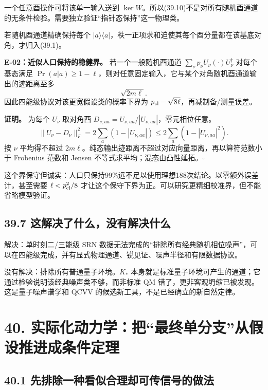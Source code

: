 \documentclass[
  11pt,
  oneside]{book}
\begin{document}
一个任意酉操作可将该单一输入送到
\(\ker W\)。所以(39.10)不是对所有随机酉通道的无条件检验。需要独立验证``指针态保持''这一物理类。

若随机酉通道精确保持每个
\(|a\rangle\langle a|\)，秩一正项求和迫使其每个酉分量都在该基底对角，才归入(39.1)。

\protect\hypertarget{e-02}{}{}

\textbf{E-02：近似人口保持的稳健界。} 若一个一般随机酉通道
\(\sum_\nu p_\nu U_\nu(\cdot)U_\nu^\dagger\) 对每个基态满足
\(\Pr(a|a)\ge1-\ell\)，则对任意固定输入，它与某个对角随机酉通道输出的迹距离至多
\[
\sqrt{2m\ell}.
\tag{39.12}
\] 因此四能级协议对该更宽假设类的概率下界为
\(p_{\rm cl}-\sqrt{8\ell}\)，再减制备/测量误差。

\textbf{证明。} 为每个 \(U_\nu\) 取对角酉
\(D_{\nu,aa}=U_{\nu,aa}/|U_{\nu,aa}|\)，零元相位任意。 \[
\|U_\nu-D_\nu\|_F^2=2\sum_a(1-|U_{\nu,aa}|)
\le2\sum_a(1-|U_{\nu,aa}|^2).
\] 按 \(\nu\) 平均得不超过
\(2m\ell\)。纯态输出迹距离不超过对应向量距离，再以算符范数小于 Frobenius
范数和 Jensen 不等式求平均；混态由凸性延拓。\(\square\)

这个界保守但诚实：人口只保持99\%远不足以使用理想188次结论。以零额外误差计，甚至需要
\(\ell<p_{\rm cl}^2/8\)
才让这个保守下界为正。可以研究更精细校准界，但不能省略模型验证。

\hypertarget{ux8fd9ux89e3ux51b3ux4e86ux4ec0ux4e48ux6ca1ux6709ux89e3ux51b3ux4ec0ux4e48}{%
\section{39.7
这解决了什么，没有解决什么}\label{ux8fd9ux89e3ux51b3ux4e86ux4ec0ux4e48ux6ca1ux6709ux89e3ux51b3ux4ec0ux4e48}}

解决：单时刻二/三能级 SRN
数据无法完成的``排除所有经典随机相位噪声''，可以在四能级完成，并有显式物理通道、锐见证、噪声半径和有限数据协议。

没有解决：排除所有普通量子环境。\(K_*\)
本身就是标准量子环境可产生的通道；它通过检验说明该经典噪声类不够，而非标准
QM 错了，更非客观坍缩已被发现。这是量子噪声谱学和 QCVV
的候选新工具，不是已经确立的新自然定律。

\hypertarget{ch-40}{%
\chapter{40.
实际化动力学：把``最终单分支''从假设推进成条件定理}\label{ch-40}}

\hypertarget{ux5148ux6392ux9664ux4e00ux79cdux770bux4f3cux5408ux7406ux5374ux53efux4f20ux4fe1ux53f7ux7684ux505aux6cd5}{%
\section{40.1
先排除一种看似合理却可传信号的做法}\label{ux5148ux6392ux9664ux4e00ux79cdux770bux4f3cux5408ux7406ux5374ux53efux4f20ux4fe1ux53f7ux7684ux505aux6cd5}}
\end{document}
